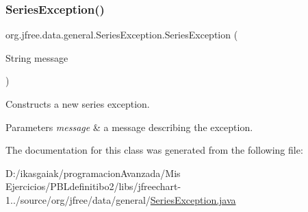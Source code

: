 \subsubsection{\texorpdfstring{Series\+Exception()}{SeriesException()}}
{\footnotesize\ttfamily org.\+jfree.\+data.\+general.\+Series\+Exception.\+Series\+Exception (\begin{DoxyParamCaption}\item[{String}]{message }\end{DoxyParamCaption})}

Constructs a new series exception.


\begin{DoxyParams}{Parameters}
{\em message} & a message describing the exception. \\
\hline
\end{DoxyParams}


The documentation for this class was generated from the following file\+:\begin{DoxyCompactItemize}
\item 
D\+:/ikasgaiak/programacion\+Avanzada/\+Mis Ejercicios/\+P\+B\+Ldefinitibo2/libs/jfreechart-\/1../source/org/jfree/data/general/\mbox{\hyperlink{_series_exception_8java}{Series\+Exception.\+java}}\end{DoxyCompactItemize}
